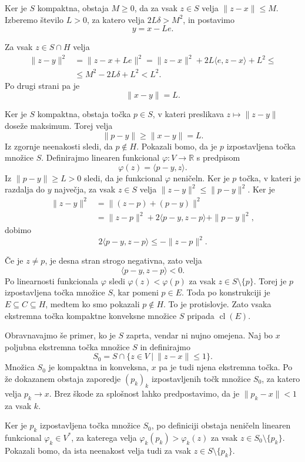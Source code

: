 \documentclass[mat2, tisk]{fmfdelo}
\begin{document}
\begin{dokaz}
Ker je $S$ kompaktna, obstaja $M\geq0$,
da za vsak $z\in S$ velja $\|z-x\|\leq M$.
Izberemo število $L>0$, za katero velja $2L\delta>M^2$,
in postavimo
\[
y=x-Le.
\]

Za vsak $z\in S\cap H$ velja
\[
\begin{aligned}
\|z-y\|^2 &=\|z-x+Le\|^2=
\|z-x\|^2+2L\langle e,z-x\rangle+L^2\leq\\
&\leq M^2-2L\delta+L^2 <L^2.
\end{aligned}
\]
Po drugi strani pa je
\[
\|x-y\|=L.
\]

Ker je $S$ kompaktna, obstaja točka
$p\in S$, v kateri preslikava
$z\mapsto\|z-y\|$ doseže maksimum.
Torej velja
\[
\|p-y\|\geq\|x-y\|=L.
\]
Iz zgornje neenakosti sledi,
da $p\notin H$.
Pokazali bomo, da je $p$ izpostavljena
točka množice $S$.
Definirajmo linearen funkcional
$\varphi\colon V\to\mathbb{R}$ s predpisom
\[
\varphi(z)=\langle p-y,z\rangle.
\]
Iz $\|p-y\|\geq L>0$ sledi, da 
je funkcional $\varphi$ neničeln.
Ker je $p$ točka, v kateri je razdalja
do $y$ največja, za vsak $z\in S$ velja
$\|z-y\|^2\leq\|p-y\|^2$.
Ker je
\[
\begin{aligned}
\|z-y\|^2
&=\|(z-p)+(p-y)\|^2\\
&=\|z-p\|^2
  +2\langle p-y,z-p\rangle
  +\|p-y\|^2,
\end{aligned}
\]
dobimo
\[
2\langle p-y,z-p\rangle
\leq-\|z-p\|^2.
\]

Če je $z\neq p$, je desna stran
strogo negativna, zato velja
\[
\langle p-y,z-p\rangle<0.
\]
Po linearnosti funkcionala $\varphi$
sledi $\varphi(z)<\varphi(p)$
za vsak $z\in S\setminus\{p\}$.
Torej je $p$ izpostavljena točka
množice $S$, kar pomeni $p\in E$.
Toda po konstrukciji je
$E\subseteq C\subseteq H$,
medtem ko smo pokazali $p\notin H$.
To je protislovje.
Zato vsaka ekstremna točka kompaktne
konveksne množice $S$ pripada
$\operatorname{cl}(E)$.

Obravnavajmo še primer, ko je $S$
zaprta, vendar ni nujno omejena.
Naj bo $x$ poljubna ekstremna točka
množice $S$ in definirajmo
\[
S_0=S\cap\{z\in V ~|~ \|z-x\|\leq1\}.
\]
Množica $S_0$ je kompaktna in konveksna,
$x$ pa je tudi njena ekstremna točka.
Po že dokazanem obstaja zaporedje
$(p_k)_k$ izpostavljenih točk množice
$S_0$, za katero velja
$p_k\longrightarrow x$.
Brez škode za splošnost lahko
predpostavimo, da je
$\|p_k-x\|<1$ za vsak $k$.

Ker je $p_k$ izpostavljena točka množice $S_0$,
po definiciji obstaja neničeln linearen
funkcional $\varphi_k\in V^*$, za katerega velja
$\varphi_k(p_k)>\varphi_k(z)$
za vsak $z\in S_0\setminus\{p_k\}$.
Pokazali bomo, da ista neenakost velja tudi
za vsak $z\in S\setminus\{p_k\}$.


\end{dokaz}
\end{document}
